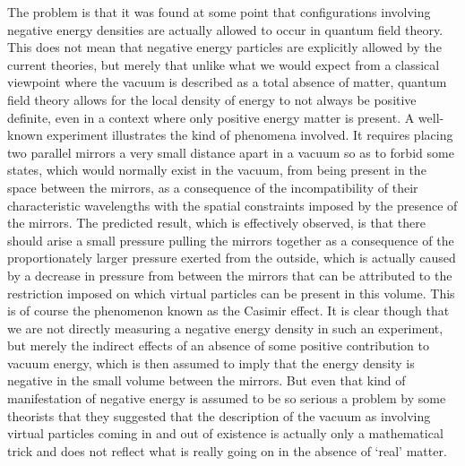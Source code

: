 \documentclass[notitlepage,12pt]{report}
\begin{document}
The problem is that it was found at some point that configurations involving negative energy densities are actually allowed to occur in quantum field theory. This does not mean that negative energy particles are explicitly allowed by the current theories, but merely that unlike what we would expect from a classical viewpoint where the vacuum is described as a total absence of matter, quantum field theory allows for the local density of energy to not always be positive definite, even in a context where only positive energy matter is present. A well-known experiment illustrates the kind of phenomena involved. It requires placing two parallel mirrors a very small distance apart in a vacuum so as to forbid some states, which would normally exist in the vacuum, from being present in the space between the mirrors, as a consequence of the incompatibility of their characteristic wavelengths with the spatial constraints imposed by the presence of the mirrors. The predicted result, which is effectively observed, is that there should arise a small pressure pulling the mirrors together as a consequence of the proportionately larger pressure exerted from the outside, which is actually caused by a decrease in pressure from between the mirrors that can be attributed to the restriction imposed on which virtual particles can be present in this volume. This is of course the phenomenon known as the Casimir effect. It is clear though that we are not directly measuring a negative energy density in such an experiment, but merely the indirect effects of an absence of some positive contribution to vacuum energy, which is then assumed to imply that the energy density is negative in the small volume between the mirrors. But even that kind of manifestation of negative energy is assumed to be so serious a problem by some theorists that they suggested that the description of the vacuum as involving virtual particles coming in and out of existence is actually only a mathematical trick and does not reflect what is really going on in the absence of `real' matter.
\end{document}
